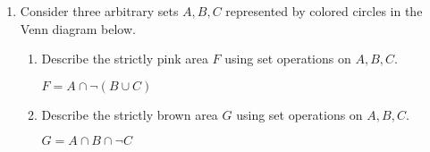 \documentclass[11pt]{article}
\begin{document}
\begin{enumerate}
		\item Consider three arbitrary sets $ A, B, C $ represented by colored circles in the Venn diagram below.
			\begin{mdframed}[default, userdefinedwidth=4.8cm]
			\end{mdframed}
			\begin{enumerate}
				\item Describe the strictly pink area $ F $ using set operations on $ A, B, C $.
					\begin{mdframed}
						$ F = A \cap \neg (B \cup C) $
					\end{mdframed}
				\item Describe the strictly brown area $ G $ using set operations on $ A, B, C $.
					\begin{mdframed}
						$ G = A \cap B \cap \neg C $
					\end{mdframed}
			\end{enumerate}
	\end{enumerate}
\end{document}
